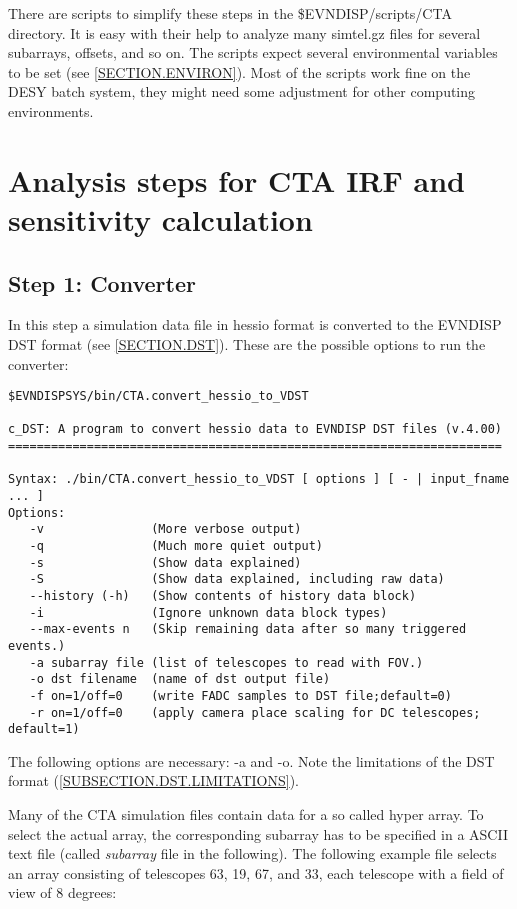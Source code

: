 \documentclass[titlepage,a4paper,twoside,11pt]{report}
\begin{document}
There are scripts to simplify these steps in the \$EVNDISP/scripts/CTA directory. 
It is easy with their help to analyze many simtel.gz files for several subarrays, offsets, and so on. 
The scripts expect several environmental variables to be set (see \ref{SECTION.ENVIRON}).
Most of the scripts work fine on the DESY batch system, they might need some adjustment for other computing environments.

\section{Analysis steps for CTA IRF and sensitivity calculation}

\subsection{Step 1: Converter}

In this step a simulation data file in hessio format is converted to the EVNDISP DST format 
(see \ref{SECTION.DST}). These are the possible options to run the converter:

\begin{lstlisting}
$EVNDISPSYS/bin/CTA.convert_hessio_to_VDST

c_DST: A program to convert hessio data to EVNDISP DST files (v.4.00)
=====================================================================

Syntax: ./bin/CTA.convert_hessio_to_VDST [ options ] [ - | input_fname ... ]
Options:
   -v               (More verbose output)
   -q               (Much more quiet output)
   -s               (Show data explained)
   -S               (Show data explained, including raw data)
   --history (-h)   (Show contents of history data block)
   -i               (Ignore unknown data block types)
   --max-events n   (Skip remaining data after so many triggered events.)
   -a subarray file (list of telescopes to read with FOV.)
   -o dst filename  (name of dst output file)
   -f on=1/off=0    (write FADC samples to DST file;default=0)
   -r on=1/off=0    (apply camera place scaling for DC telescopes; default=1)
\end{lstlisting}

The following options are necessary: -a and -o.
Note the limitations of the DST format (\ref{SUBSECTION.DST.LIMITATIONS}).

Many of the CTA simulation files contain data for a so called hyper array. 
To select the actual array, the corresponding subarray has to be specified in a ASCII text file (called {\it subarray} file in the following).
The following example file selects an array consisting of telescopes 63, 19, 67, and 33, each telescope
with a field of view of 8 degrees:
\end{document}
